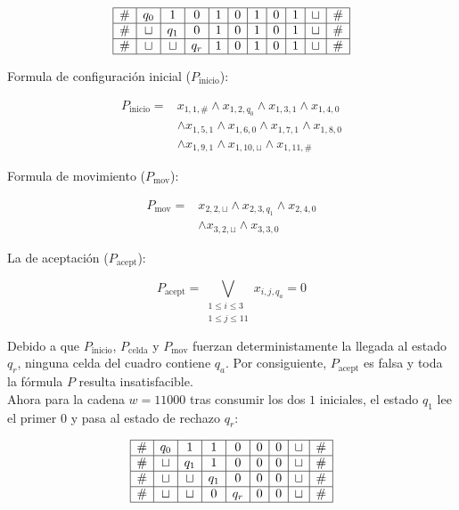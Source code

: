 \[
\begin{array}{|c|c|c|c|c|c|c|c|c|c|c|}
\hline
\# & q_0 & 1 & 0 & 1 & 0 & 1 & 0 & 1 & \sqcup & \# \\
\hline
\# & \sqcup & q_1 & 0 & 1 & 0 & 1 & 0 & 1 & \sqcup & \# \\
\hline
\# & \sqcup & \sqcup & q_r & 1 & 0 & 1 & 0 & 1 & \sqcup & \# \\
\hline
\end{array}
\]

Formula de configuración inicial ($P_{\mathrm{inicio}}$):

\[
\begin{aligned}
P_{\mathrm{inicio}} ={}&
x_{1,1,\#} \wedge x_{1,2,q_0}
\wedge x_{1,3,1} \wedge x_{1,4,0}\\
&\wedge x_{1,5,1} \wedge x_{1,6,0}
\wedge x_{1,7,1} \wedge x_{1,8,0}\\
&\wedge x_{1,9,1} \wedge x_{1,10,\sqcup}
\wedge x_{1,11,\#}
\end{aligned}
\]

Formula de movimiento ($P_{\mathrm{mov}}$):

\[
\begin{aligned}
P_{\mathrm{mov}} ={}&
x_{2,2,\sqcup} \wedge x_{2,3,q_1}
\wedge x_{2,4,0}\\
&\wedge x_{3,2,\sqcup}
\wedge x_{3,3,0}
\end{aligned}
\]

La de aceptación ($P_{\mathrm{acept}}$):

\[
P_{\mathrm{acept}} =
\bigvee_{\substack{1 \leq i \leq 3\\
1 \leq j \leq 11}}
x_{i,j,q_a}
=
\text{0}
\]

Debido a que $P_{\mathrm{inicio}}$,
$P_{\mathrm{celda}}$ y $P_{\mathrm{mov}}$
fuerzan deterministamente la llegada al estado $q_r$,
ninguna celda del cuadro contiene $q_a$.
Por consiguiente, $P_{\mathrm{acept}}$ es falsa
y toda la fórmula $P$ resulta insatisfacible.\\

Ahora para la cadena $w=11000$ tras consumir los dos $1$
iniciales, el estado $q_1$ lee el primer $0$
y pasa al estado de rechazo $q_r$:

\[
\begin{array}{|c|c|c|c|c|c|c|c|c|}
\hline
\# & q_0 & 1 & 1 & 0 & 0 & 0 & \sqcup & \# \\
\hline
\# & \sqcup & q_1 & 1 & 0 & 0 & 0 & \sqcup & \# \\
\hline
\# & \sqcup & \sqcup & q_1 & 0 & 0 & 0 & \sqcup & \# \\
\hline
\# & \sqcup & \sqcup & 0 & q_r & 0 & 0 & \sqcup & \# \\
\hline
\end{array}
\]

